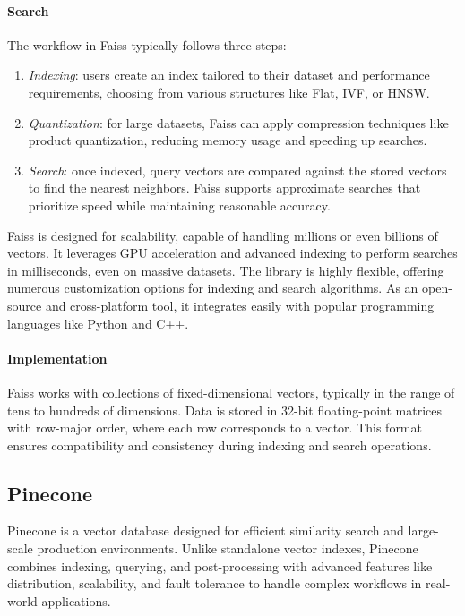 \paragraph*{Search}
The workflow in Faiss typically follows three steps:
\begin{enumerate}
    \item \textit{Indexing}: users create an index tailored to their dataset and performance requirements, choosing from various structures like Flat, IVF, or HNSW.
    \item \textit{Quantization}: for large datasets, Faiss can apply compression techniques like product quantization, reducing memory usage and speeding up searches.
    \item \textit{Search}: once indexed, query vectors are compared against the stored vectors to find the nearest neighbors.
        Faiss supports approximate searches that prioritize speed while maintaining reasonable accuracy.
\end{enumerate}
\noindent Faiss is designed for scalability, capable of handling millions or even billions of vectors. 
It leverages GPU acceleration and advanced indexing to perform searches in milliseconds, even on massive datasets. 
The library is highly flexible, offering numerous customization options for indexing and search algorithms. As an open-source and cross-platform tool, it integrates easily with popular programming languages like Python and C++.

\paragraph*{Implementation}
Faiss works with collections of fixed-dimensional vectors, typically in the range of tens to hundreds of dimensions.
Data is stored in 32-bit floating-point matrices with row-major order, where each row corresponds to a vector. 
This format ensures compatibility and consistency during indexing and search operations.

\subsection{Pinecone}
Pinecone is a vector database designed for efficient similarity search and large-scale production environments. 
Unlike standalone vector indexes, Pinecone combines indexing, querying, and post-processing with advanced features like distribution, scalability, and fault tolerance to handle complex workflows in real-world applications.

